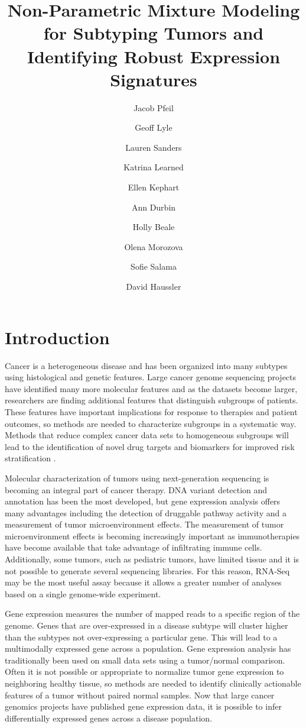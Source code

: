 \documentclass[fleqn,10pt]{wlscirep}
\title{Non-Parametric Mixture Modeling for Subtyping Tumors and Identifying Robust Expression Signatures}
\author[1,*]{Jacob Pfeil}
\author[1]{Geoff Lyle}
\author[1]{Lauren Sanders}
\author[1]{Katrina Learned}
\author[1]{Ellen Kephart}
\author[1]{Ann Durbin}
\author[1]{Holly Beale}
\author[1]{Olena Morozova}
\author[1]{Sofie Salama}
\author[1]{David Haussler}
\affil[1]{University of California, Santa Cruz, Biomolecular Engineering, Santa Cruz, 95064, United States}
\affil[*]{jpfeil@ucsc.edu}
\begin{document}
\flushbottom
\maketitle
%
%
\thispagestyle{empty}


\section*{Introduction}

Cancer is a heterogeneous disease and has been organized into many subtypes using histological and genetic features. Large cancer genome sequencing projects have identified many more molecular features and as the datasets become larger, researchers are finding additional features that distinguish subgroups of patients. These features have important implications for response to therapies and patient outcomes, so methods are needed to characterize subgroups in a systematic way. Methods that reduce complex cancer data sets to homogeneous subgroups will lead to the identification of novel drug targets and biomarkers for improved risk stratification \cite{zhao2018molecular}.

Molecular characterization of tumors using next-generation sequencing is becoming an integral part of cancer therapy. DNA variant detection and annotation has been the most developed, but gene expression analysis offers many advantages including the detection of druggable pathway activity and a measurement of tumor microenvironment effects. The measurement of tumor microenvironment effects is becoming increasingly important as immunotherapies have become available that take advantage of infiltrating immune cells. Additionally, some tumors, such as pediatric tumors, have limited tissue and it is not possible to generate several sequencing libraries. For this reason, RNA-Seq may be the most useful assay because it allows a greater number of analyses based on a single genome-wide experiment.

Gene expression measures the number of mapped reads to a specific region of the genome. Genes that are over-expressed in a disease subtype will cluster higher than the subtypes not over-expressing a particular gene. This will lead to a multimodally expressed gene across a population. Gene expression analysis has traditionally been used on small data sets using a tumor/normal comparison. Often it is not possible or appropriate to normalize tumor gene expression to neighboring healthy tissue, so methods are needed to identify clinically actionable features of a tumor without paired normal samples. Now that large cancer genomics projects have published gene expression data, it is possible to infer differentially expressed genes across a disease population.
\end{document}
